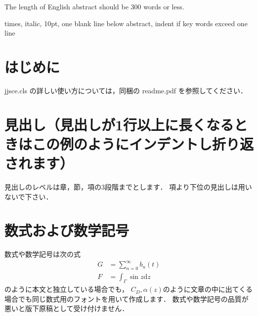 \documentclass{jjsce}
\begin{document}


\begin{abstract}
要旨の長さは350字以内です．キーワードは5つ程度書いて下さい．
\end{abstract}
\begin{Eabstract}
The length of English abstract should be 300 words or less.
\end{Eabstract}
\begin{keyword}
times, italic, 10pt, one blank line below abstract, indent if key words exceed one line
\end{keyword}
\maketitle

\section{はじめに}

jjsce.cls の詳しい使い方については，同梱の readme.pdf を参照してください．

\section{見出し（見出しが1行以上に長くなるときはこの例のようにインデントし折り返されます）}

見出しのレベルは章，節，項の3段階までとします．
項より下位の見出しは用いないで下さい．

\section{数式および数学記号}

数式や数学記号は次の式
\begin{align}
G&=\sum_{n=0}^\infty b_n(t)\\
F&=\int_{\Gamma}\sin z \mathrm{d}z
\end{align}
のように本文と独立している場合でも，
$C_D, \alpha(z)$のように文章の中に出てくる場合でも同じ数式用のフォントを用いて作成します．
数式や数学記号の品質が悪いと版下原稿として受け付けません．
\end{document}
